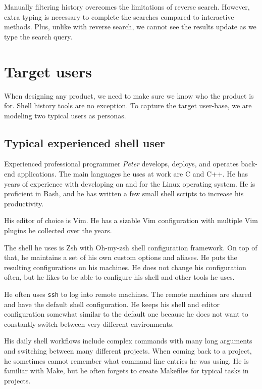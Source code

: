 Manually filtering history overcomes the limitations of reverse search. However, extra typing is necessary to complete the searches compared to interactive methods. Plus, unlike with reverse search, we cannot see the results update as we type the search query.


\section{Target users}

When designing any product, we need to make sure we know who the product is for. Shell history tools are no exception. To capture the target user-base, we are modeling two typical users as personas.


\subsection{Typical experienced shell user}

Experienced professional programmer \textit{Peter} develops, deploys, and operates back-end applications. The main languages he uses at work are C and C++. He has years of experience with developing on and for the Linux operating system. He is proficient in Bash, and he has written a few small shell scripts to increase his productivity.

His editor of choice is Vim. He has a sizable Vim configuration with multiple Vim plugins he collected over the years.

The shell he uses is Zsh with Oh-my-zsh \cite{toolsohmyzsh} shell configuration framework. On top of that, he maintains a set of his own custom options and aliases. He puts the resulting configurations on his machines. He does not change his configuration often, but he likes to be able to configure his shell and other tools he uses.

He often uses \verb|ssh| to log into remote machines. The remote machines are shared and have the default shell configuration. He keeps his shell and editor configuration somewhat similar to the default one because he does not want to constantly switch between very different environments. 

His daily shell workflows include complex commands with many long arguments and switching between many different projects. When coming back to a project, he sometimes cannot remember what command line entries he was using. He is familiar with Make, but he often forgets to create Makefiles for typical tasks in projects.

